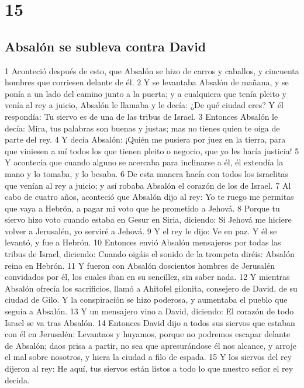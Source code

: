 \chapter{15}

\section*{Absalón se subleva contra David}

1 Aconteció después de esto, que Absalón se hizo de carros y caballos, y cincuenta hombres que corriesen delante de él.
2 Y se levantaba Absalón de mañana, y se ponía a un lado del camino junto a la puerta; y a cualquiera que tenía pleito y venía al rey a juicio, Absalón le llamaba y le decía: ¿De qué ciudad eres? Y él respondía: Tu siervo es de una de las tribus de Israel.
3 Entonces Absalón le decía: Mira, tus palabras son buenas y justas; mas no tienes quien te oiga de parte del rey.
4 Y decía Absalón: ¡Quién me pusiera por juez en la tierra, para que viniesen a mí todos los que tienen pleito o negocio, que yo les haría justicia! 
5 Y acontecía que cuando alguno se acercaba para inclinarse a él, él extendía la mano y lo tomaba, y lo besaba.
6 De esta manera hacía con todos los israelitas que venían al rey a juicio; y así robaba Absalón el corazón de los de Israel.
7 Al cabo de cuatro años, aconteció que Absalón dijo al rey: Yo te ruego me permitas que vaya a Hebrón, a pagar mi voto que he prometido a Jehová.
8 Porque tu siervo hizo voto cuando estaba en Gesur en Siria, diciendo: Si Jehová me hiciere volver a Jerusalén, yo serviré a Jehová.
9 Y el rey le dijo: Ve en paz. Y él se levantó, y fue a Hebrón.
10 Entonces envió Absalón mensajeros por todas las tribus de Israel, diciendo: Cuando oigáis el sonido de la trompeta diréis: Absalón reina en Hebrón.
11 Y fueron con Absalón doscientos hombres de Jerusalén convidados por él, los cuales iban en su sencillez, sin saber nada.
12 Y mientras Absalón ofrecía los sacrificios, llamó a Ahitofel gilonita, consejero de David, de su ciudad de Gilo. Y la conspiración se hizo poderosa, y aumentaba el pueblo que seguía a Absalón.
13 Y un mensajero vino a David, diciendo: El corazón de todo Israel se va tras Absalón.
14 Entonces David dijo a todos sus siervos que estaban con él en Jerusalén: Levantaos y huyamos, porque no podremos escapar delante de Absalón; daos prisa a partir, no sea que apresurándose él nos alcance, y arroje el mal sobre nosotros, y hiera la ciudad a filo de espada.
15 Y los siervos del rey dijeron al rey: He aquí, tus siervos están listos a todo lo que nuestro señor el rey decida.
